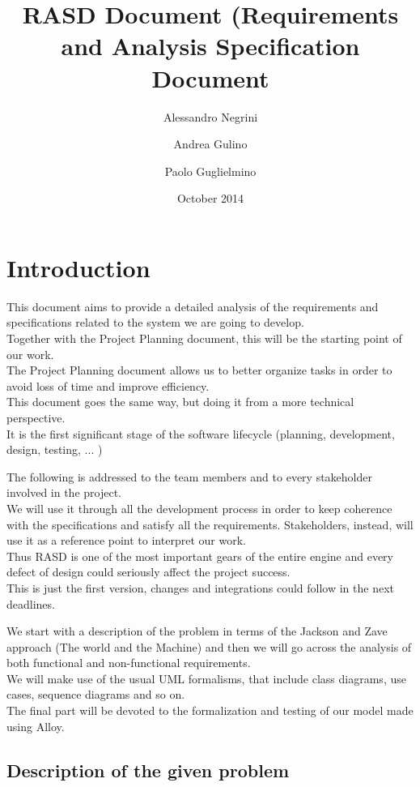 \documentclass[12pt]{book}
\title{RASD Document (Requirements and Analysis Specification Document}
\author{Alessandro Negrini \and Andrea Gulino \and Paolo Guglielmino}
\date{October 2014}
\begin{document}

\tableofcontents

\newpage
\vspace*{30cm}
\chapter{Introduction}
This document aims to provide a detailed analysis of the requirements and specifications related to the system we are going to develop. \\
Together with the Project Planning document, this will be the starting point of our work.\\
The Project Planning document allows us to better organize tasks in order to avoid loss of time and improve efficiency.\\
This document goes the same way, but doing it from a more technical perspective.\\
It is the first significant stage of the software lifecycle  (planning, development, design, testing, ... )\\ \medskip

The following is addressed to the team members and to every stakeholder involved in the project.\\
We will use it through all the development process in order to keep coherence with the specifications and satisfy all the requirements. Stakeholders, instead, will use it as a reference point to interpret our work.\\
Thus RASD is one of the most important gears of the entire engine and every defect of design could seriously affect the project success.\\ 
This is just the first version, changes and integrations could follow in the next deadlines.\\ \medskip

We start with a description of the problem in terms of the Jackson and Zave approach (The world and the Machine) and then we will go across the analysis of both functional and non-functional requirements.\\
We will make use of the usual UML formalisms, that include class diagrams, use cases, sequence diagrams and so on.\\
The final part will be devoted to the formalization and testing of our model made using Alloy.\\

\section{Description of the given problem}
\end{document}

